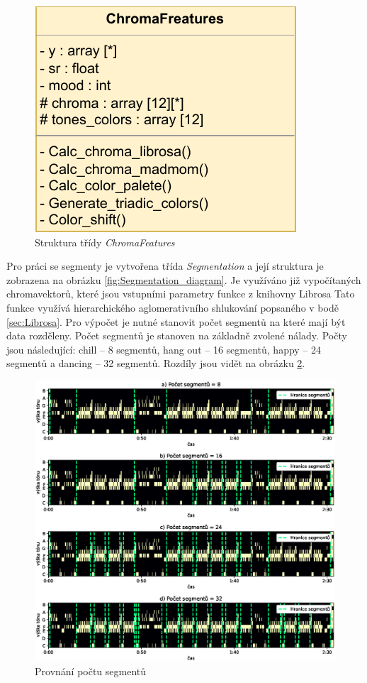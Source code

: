 \begin{figure}[H]
    \centering
        \includegraphics[width = 0.3\linewidth]{obrazky/UML_diagram_ChromaFeatures.pdf}
        \caption{Struktura třídy \textit{ChromaFeatures}}
        \label{fig:ChromaFeatures_class_diagram}
\end{figure}

Pro práci se segmenty je vytvořena třída \textit{Segmentation} a její struktura je zobrazena na obrázku \ref{fig:Segmentation_diagram}. Je využíváno již vypočítaných chromavektorů, které jsou vstupními parametry funkce z knihovny Librosa Tato funkce využívá hierarchického aglomerativního shlukování popsaného v bodě \ref{sec:Librosa}. Pro výpočet je nutné stanovit počet segmentů na které mají být data rozděleny. Počet segmentů je stanoven na základně zvolené nálady. Počty jsou následující: chill -- 8 segmentů, hang out -- 16 segmentů, happy -- 24 segmentů a dancing -- 32 segmentů. Rozdíly jsou vidět na obrázku \ref{fig:Segmentation_segments_comparison}.

\begin{figure}[H]
    \centering
    \includegraphics[width = 1\linewidth]{obrazky/Segmentation_segments_comparisons.eps}
    \caption{Provnání počtu segmentů}
    \label{fig:Segmentation_segments_comparison}
\end{figure}

